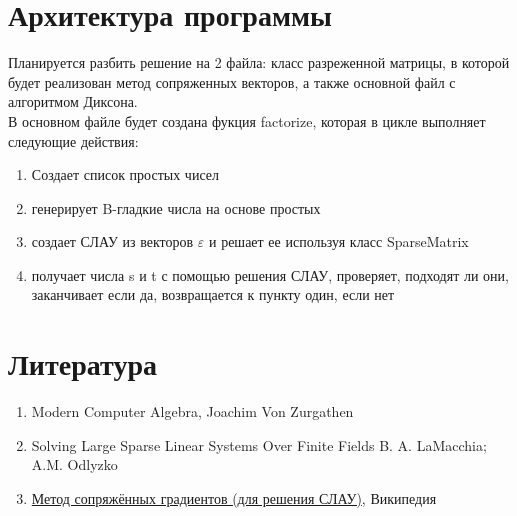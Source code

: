 \documentclass[14pt,a4paper,]{article}
\def\EPS{\varepsilon}         %
\begin{document}
\section{Архитектура программы}
Планируется разбить решение на 2 файла: класс разреженной матрицы, в которой будет реализован метод сопряженных векторов, а также основной файл с алгоритмом Диксона.\\
В основном файле будет создана фукция factorize, которая в цикле выполняет следующие действия:
\begin{enumerate}
    \item Создает список простых чисел
    \item генерирует B-гладкие числа на основе простых
    \item создает СЛАУ из векторов $\EPS$ и решает ее используя класс SparseMatrix
    \item получает числа s и t с помощью решения СЛАУ, проверяет, подходят ли они, заканчивает если да, возвращается к пункту один, если нет
\end{enumerate}
\section{Литература}
\begin{enumerate}
    \item Modern Computer Algebra, Joachim Von Zurgathen
    \item Solving Large Sparse Linear Systems Over Finite Fields B. A. LaMacchia; A.M. Odlyzko
    \item \href{https://ru.wikipedia.org/wiki/%D0%9C%D0%B5%D1%82%D0%BE%D0%B4_%D1%81%D0%BE%D0%BF%D1%80%D1%8F%D0%B6%D1%91%D0%BD%D0%BD%D1%8B%D1%85_%D0%B3%D1%80%D0%B0%D0%B4%D0%B8%D0%B5%D0%BD%D1%82%D0%BE%D0%B2_(%D0%B4%D0%BB%D1%8F_%D1%80%D0%B5%D1%88%D0%B5%D0%BD%D0%B8%D1%8F_%D0%A1%D0%9B%D0%90%D0%A3)}{Метод сопряжённых градиентов (для решения СЛАУ)}, Википедия
\end{enumerate}
\end{document}
